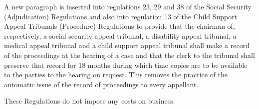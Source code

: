 \documentclass[12pt,a4paper]{article}
\begin{document}
  A new paragraph is inserted into regulations 23, 29 and 38 of the Social Security (Adjudication) Regulations and also into regulation 13 of the Child Support Appeal Tribunals (Procedure) Regulations to provide that the chairman of, respectively, a social security appeal tribunal, a disability appeal tribunal, a medical appeal tribunal and a child support appeal tribunal shall make a record of the proceedings at the hearing of a case and that the clerk to the tribunal shall preserve that record for 18 months during which time copies are to be available to the parties to the hearing on request. This removes the practice of the automatic issue of the record of proceedings to every appellant.

  These Regulations do not impose any costs on business.
\end{document}
